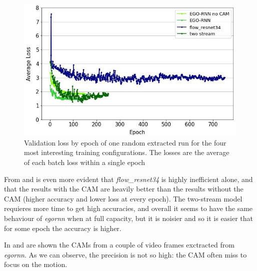\documentclass[10pt,twocolumn,hidelinks,letterpaper]{article}
\begin{document}
\begin{figure}[t]
	\centering
	\includegraphics[width=\linewidth]{images/step1_loss.jpg}
	\caption{Validation loss by epoch of one random extracted run for the four most interesting training configurations. The losses are the average of each batch loss within a single epoch}
	\label{step1_loss}
\end{figure}

From  and  is even more evident that \textit{flow\_resnet34} is highly inefficient alone, and that the results with the CAM are heavily better than the results without the CAM (higher accuracy and lower loss at every epoch). The two-stream model requieres more time to get high accuracies, and overall it seems to have the same behaviour of \textit{egornn} when at full capacity, but it is noisier and so it is easier that for some epoch the accuracy is higher.

In  and  are shown the CAMs from a couple of video frames exctracted from \textit{egornn}. As we can observe, the precision is not so high: the CAM often miss to focus on the motion.
\end{document}
